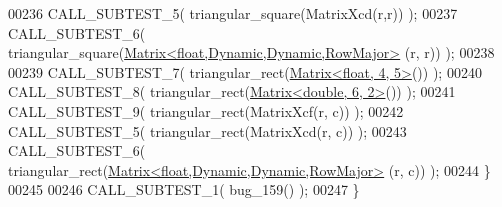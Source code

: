 \begin{DoxyCode}
00236     CALL\_SUBTEST\_5( triangular\_square(MatrixXcd(r,r)) );
00237     CALL\_SUBTEST\_6( triangular\_square(\hyperlink{group___core___module_class_eigen_1_1_matrix}{Matrix<float,Dynamic,Dynamic,RowMajor>}
      (r, r)) );
00238 
00239     CALL\_SUBTEST\_7( triangular\_rect(\hyperlink{group___core___module_class_eigen_1_1_matrix}{Matrix<float, 4, 5>}()) );
00240     CALL\_SUBTEST\_8( triangular\_rect(\hyperlink{group___core___module_class_eigen_1_1_matrix}{Matrix<double, 6, 2>}()) );
00241     CALL\_SUBTEST\_9( triangular\_rect(MatrixXcf(r, c)) );
00242     CALL\_SUBTEST\_5( triangular\_rect(MatrixXcd(r, c)) );
00243     CALL\_SUBTEST\_6( triangular\_rect(\hyperlink{group___core___module_class_eigen_1_1_matrix}{Matrix<float,Dynamic,Dynamic,RowMajor>}
      (r, c)) );
00244   \}
00245   
00246   CALL\_SUBTEST\_1( bug\_159() );
00247 \}
\end{DoxyCode}
